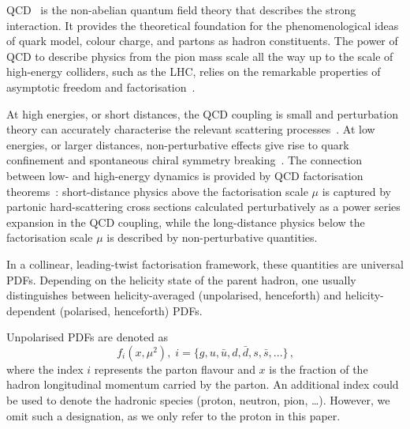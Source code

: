 QCD~\cite{Collins:2011zzd} is the non-abelian quantum field 
theory that describes the strong interaction.
%
It provides the theoretical foundation for the phenomenological ideas of 
quark model, colour charge, and partons as hadron constituents.
%
The power of QCD to describe physics from the pion mass scale all the way up 
to the scale of high-energy colliders, such as the LHC, relies on the 
remarkable properties of asymptotic freedom and 
factorisation~\cite{Gross:1973ju,Gross:1973id,Gross:1974cs,Politzer:1974fr}.

At high energies, or short distances, the QCD coupling is small 
and perturbation theory can accurately characterise the relevant scattering 
processes~\cite{Campbell:2006wx}.
%
At low energies, or larger distances, non-perturbative effects give rise to 
quark confinement and spontaneous chiral symmetry breaking~\cite{Gasser:1983yg}.
%
%
%
The connection between low- and high-energy dynamics is provided by QCD 
factorisation theorems~\cite{Collins:1989gx}: 
short-distance physics above the factorisation scale $\mu$ is captured by 
partonic hard-scattering cross sections calculated perturbatively as a 
power series expansion in the QCD coupling, while the 
long-distance physics below the factorisation scale $\mu$ is described by 
non-perturbative quantities.

In a collinear, leading-twist factorisation framework, these quantities are
universal PDFs.
%
Depending on the helicity state of the parent hadron, one usually 
distinguishes between helicity-averaged (unpolarised, henceforth)
and helicity-dependent (polarised, henceforth) PDFs.

Unpolarised PDFs are denoted as 
\begin{equation}
f_{i}(x,\mu^2)\mbox{,} \ \ i=\{g,u,\bar{u},d,\bar{d},s,\bar{s},...\}
\,\mbox{,}
\label{eq:unpPDFs}
\end{equation}
where the index $i$ represents the parton flavour and $x$ is the fraction
of the hadron longitudinal momentum carried by the parton.
%
An additional index could be used to denote the hadronic species (proton,
neutron, pion, \dots).
%
However, we omit such a designation, as we only refer to the proton
in this paper.

